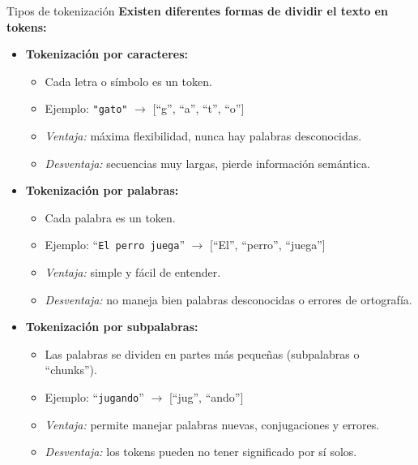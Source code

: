\documentclass[aspectratio=169,xcolor=dvipsnames, t]{beamer}
\begin{document}
\begin{frame}{Tipos de tokenización}
    \textbf{Existen diferentes formas de dividir el texto en tokens:}
    \vspace{0.3cm}
    \begin{itemize}
        \item \textbf{Tokenización por caracteres:}
        \begin{itemize}
            \item Cada letra o símbolo es un token.
            \item Ejemplo: \texttt{"gato"} $\rightarrow$ [``g'', ``a'', ``t'', ``o'']
            \item \textit{Ventaja:} máxima flexibilidad, nunca hay palabras desconocidas.
            \item \textit{Desventaja:} secuencias muy largas, pierde información semántica.
        \end{itemize}    
        \item \textbf{Tokenización por palabras:}
        \vspace{0.2cm}
        \begin{itemize}
            \item Cada palabra es un token.
            \item Ejemplo: ``\texttt{El perro juega}'' $\rightarrow$ [``El'', ``perro'', ``juega'']
            \item \textit{Ventaja:} simple y fácil de entender.
            \item \textit{Desventaja:} no maneja bien palabras desconocidas o errores de ortografía.
        \end{itemize}
        \vspace{0.2cm}
        \item \textbf{Tokenización por subpalabras:}
        \begin{itemize}
            \item Las palabras se dividen en partes más pequeñas (subpalabras o ``chunks'').
            \item Ejemplo: ``\texttt{jugando}'' $\rightarrow$ [``jug'', ``ando'']
            \item \textit{Ventaja:} permite manejar palabras nuevas, conjugaciones y errores.
            \item \textit{Desventaja:} los tokens pueden no tener significado por sí solos.
        \end{itemize}
        \vspace{0.2cm}

    \end{itemize}
    \vspace{0.3cm}
    
\end{frame}
\end{document}

